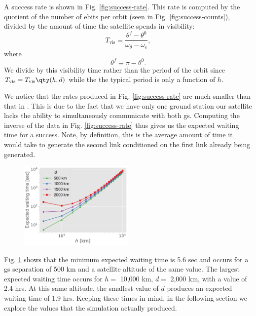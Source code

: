 A success rate is shown in Fig. \ref{fig:success-rate}. This rate is computed by the quotient of the number of ebits per orbit (seen in Fig. \ref{fig:success-counts}), divided by the amount of time the satellite spends in visibility:
\begin{equation}
    T_{\text{vis}} = \frac{\theta^f - \theta^0}{\omega_\theta - \omega_e},
\end{equation}
where
\begin{equation*}
    \theta^f \equiv \pi - \theta^0.
\end{equation*}
We divide by this visibility time rather than the period of the orbit since \(T_{\text{vis}} = T_{\text{vis}} \qty(h, d)\) while the the typical period is only a function of \(h\).

We notice that the rates produced in Fig. \ref{fig:success-rate} are much smaller than that in \cite{khatri2021}. This is due to the fact that we have only one ground station our satellite lacks the ability to simultaneously communicate with both gs. Computing the inverse of the data in Fig. \ref{fig:success-rate} thus gives us the expected waiting time for a success. Note, by definition, this is the average amount of time it would take to generate the second link conditioned on the first link already being generated.

\begin{figure}
    \centering
    \vspace{-.1\baselineskip}
    \includegraphics[width=0.5\textwidth]{figures/exp-time.pdf}
    \caption{}
    \label{fig:exp-time}
\end{figure}

Fig. \ref{fig:exp-time} shows that the minimum expected waiting time is 5.6 sec and occurs for a gs separation of 500 km and a satellite altitude of the same value. The largest expected waiting time occurs for \(h =\) 10,000 km, \(d =\) 2,000 km, with a value of 2.4 hrs. At this same altitude, the smallest value of \(d\) produces an expected waiting time of 1.9 hrs. Keeping these times in mind, in the following section we explore the values that the simulation actually produced.

